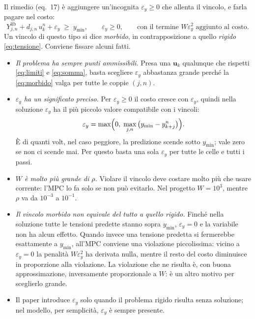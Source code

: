 \documentclass[11pt,a4paper]{article}
\newcommand{\vett}[1]{\boldsymbol{#1}}      %
\newcommand{\lib}{\mathrm{lib}}             %
\begin{document}
Il rimedio (eq.~17) è aggiungere un'incognita $\varepsilon_y \ge 0$ che allenta il vincolo,
e farla pagare nel costo:
\begin{equation}
  Y^\lib_{j,n} + d_{j,n}\,u^n_k + \varepsilon_y \;\ge\; y_{\min} , \qquad \varepsilon_y \ge 0 ,
  \qquad \text{con il termine } W \varepsilon_y^2 \text{ aggiunto al costo.}
  \label{eq:morbido}
\end{equation}
Un vincolo di questo tipo si dice \emph{morbido}, in contrapposizione a quello
\emph{rigido} \eqref{eq:tensione}. Conviene fissare alcuni fatti.
\begin{itemize}
  \item \emph{Il problema ha sempre punti ammissibili.} Presa una $\vett{u}_k$
        qualunque che rispetti \eqref{eq:limiti} e \eqref{eq:somma}, basta
        scegliere $\varepsilon_y$ abbastanza grande perché la \eqref{eq:morbido} valga per
        tutte le coppie $(j,n)$.
  \item \emph{$\varepsilon_y$ ha un significato preciso.} Per $\varepsilon_y \ge 0$ il costo cresce
        con $\varepsilon_y$, quindi nella soluzione $\varepsilon_y$ ha il più piccolo valore
        compatibile con i vincoli:
        \[
          \varepsilon_y = \max\Bigl(0,\; \max_{j,n}\,\bigl(y_{\min} - y^n_{k+j}\bigr)\Bigr) .
        \]
        È di quanti volt, nel caso peggiore, la predizione scende sotto
        $y_{\min}$; vale zero se non ci scende mai. Per questo basta una sola
        $\varepsilon_y$ per tutte le celle e tutti i passi.
  \item \emph{$W$ è molto più grande di $\rho$.} Violare il vincolo deve
        costare molto più che usare corrente: l'MPC lo fa solo se non può
        evitarlo. Nel progetto $W = 10^3$, mentre $\rho$ va da $10^{-3}$ a
        $10^{-1}$.
  \item \emph{Il vincolo morbido non equivale del tutto a quello rigido.}
        Finché nella soluzione tutte le tensioni predette stanno sopra
        $y_{\min}$, $\varepsilon_y = 0$ e la variabile non ha alcun effetto. Quando invece
        una tensione predetta si fermerebbe esattamente a $y_{\min}$, all'MPC
        conviene una violazione piccolissima: vicino a $\varepsilon_y = 0$ la penalità
        $W \varepsilon_y^2$ ha derivata nulla, mentre il resto del costo diminuisce in
        proporzione alla violazione. La violazione che ne risulta è, con buona
        approssimazione, inversamente proporzionale a $W$: è un altro motivo
        per sceglierlo grande.
  \item Il paper introduce $\varepsilon_y$ solo quando il problema rigido risulta senza
        soluzione; nel modello, per semplicità, $\varepsilon_y$ è sempre presente.
\end{itemize}
\end{document}
